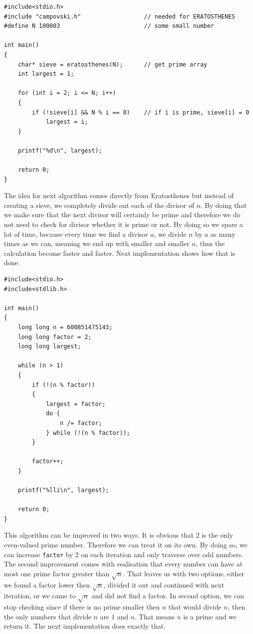 \documentclass{book}
\begin{document}
\begin{verbatim}
#include<stdio.h>
#include "campovski.h"                  // needed for ERATOSTHENES
#define N 100003                        // some small number

int main()
{
    char* sieve = eratosthenes(N);      // get prime array
    int largest = 1;

    for (int i = 2; i <= N; i++)
    {
        if (!sieve[i] && N % i == 0)    // if i is prime, sieve[i] = 0
            largest = i;
    }

    printf("%d\n", largest);

    return 0;
}

\end{verbatim}

The idea for next algorithm comes directly from Eratosthenes but instead of creating a sieve, we completely divide out each of the divisor of $n$. By doing that we make sure that the next divisor will certainly be prime and therefore we do not need to check for divisor whether it is prime or not. By doing so we spare a lot of time, because every time we find a divisor $a$, we divide $n$ by $a$ as many times as we can, meaning we end up with smaller and smaller $n$, thus the calculation become faster and faster. Next implementation shows how that is done.

\begin{verbatim}
#include<stdio.h>
#include<stdlib.h>

int main()
{
    long long n = 600851475143;
    long long factor = 2;
    long long largest;

    while (n > 1)
    {
        if (!(n % factor))
        {
            largest = factor;
            do {
                n /= factor;
            } while (!(n % factor));
        }

        factor++;
    }

    printf("%lli\n", largest);

    return 0;
}
\end{verbatim}

This algorithm can be improved in two ways. It is obvious that $2$ is the only even-valued prime number. Therefore we can treat it on its own. By doing so, we can increase \texttt{factor} by 2 on each iteration and only traverse over odd numbers. The second improvement comes with realisation that every number can have at most one prime factor greater than $\sqrt{n}$. That leaves us with two options, either we found a factor lower then $\sqrt{n}$, divided it out and continued with next iteration, or we came to $\sqrt{n}$ and did not find a factor. In second option, we can stop checking since if there is no prime smaller then $n$ that would divide $n$, then the only numbers that divide $n$ are $1$ and $n$. That means $n$ is a prime and we return it. The next implementation does exactly that.
\end{document}
